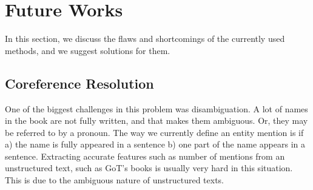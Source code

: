 \documentclass[letterpaper]{article}
\begin{document}










\section{Future Works}

In this section, we discuss the flaws and shortcomings of the currently used methods, and we suggest solutions for them.
\subsection{Coreference Resolution}
One of the biggest challenges in this problem was disambiguation. A lot of names in the book are not fully written, and that makes them ambiguous. Or, they may be referred to by a pronoun. The way we currently define an entity mention is if a) the name is fully appeared in a sentence b) one part of the name appears in a sentence. Extracting accurate features such as number of mentions from an unstructured text, such as GoT's books is usually very hard in this situation. This is due to the ambiguous nature of unstructured texts. 

\end{document}
